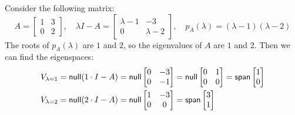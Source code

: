 \begin{example}
  Consider the following matrix:
  \[
    A = \begin{bmatrix}
      1 & 3 \\
      0 & 2
    \end{bmatrix}, \quad \lambda I - A = \begin{bmatrix}
      \lambda - 1 & -3          \\
      0           & \lambda - 2
    \end{bmatrix}, \quad p_A (\lambda) = (\lambda - 1)(\lambda - 2)
  \]
  The roots of $p_A (\lambda)$ are $1$ and $2$, so the eigenvalues of $A$ are $1$ and $2$. Then we can find the eigenspaces:
  \begin{align*}
    V_{\lambda = 1} & = \operatorname{\text{\normalfont\sffamily null}}(1 \cdot I - A) = \operatorname{\text{\normalfont\sffamily null}} \begin{bmatrix}
                                                     0 & -3 \\
                                                     0 & -1
                                                   \end{bmatrix} = \operatorname{\text{\normalfont\sffamily null}} \begin{bmatrix}
                                                                          0 & 1 \\
                                                                          0 & 0
                                                                        \end{bmatrix} = \operatorname{\text{\normalfont\sffamily span}} \begin{bmatrix}
                                                                                               1 \\
                                                                                               0
                                                                                             \end{bmatrix} \\
    V_{\lambda = 2} & = \operatorname{\text{\normalfont\sffamily null}}(2 \cdot I - A) = \operatorname{\text{\normalfont\sffamily null}} \begin{bmatrix}
                                                     1 & -3 \\
                                                     0 & 0
                                                   \end{bmatrix} = \operatorname{\text{\normalfont\sffamily span}} \begin{bmatrix}
                                                                          3 \\
                                                                          1

\end{bmatrix}
\end{align*}
\end{example}
